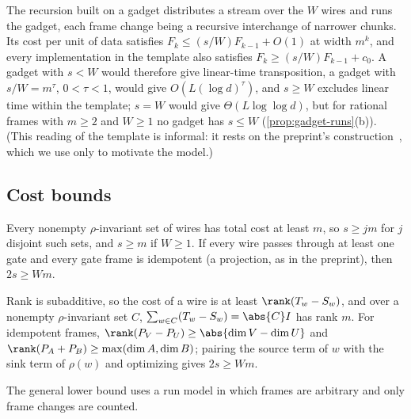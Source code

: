 The recursion built on a gadget distributes a stream over the $W$ wires and runs the gadget, each frame
change being a recursive interchange of narrower chunks. Its cost per unit of data satisfies
$F_k\le(s/W)F_{k-1}+O(1)$ at width $m^k$, and every implementation in the template also satisfies
$F_k\ge(s/W)F_{k-1}+c_0$. A gadget with $s<W$ would therefore give linear-time transposition, a gadget
with $s/W=m^\tau$, $0<\tau<1$, would give $O(L(\log d)^\tau)$, and $s\ge W$ excludes linear time within the
template; $s=W$ would give $\Theta(L\log\log d)$, but for rational frames with $m\ge2$ and $W\ge1$ no gadget has $s\le W$ (\cref{prop:gadget-runs}(b)). (This reading of the template is informal: it rests on the
preprint's construction~\cite{OpenAI2026mult}, which we use only to motivate the model.)

\subsection{Cost bounds}

\begin{theorem}\label{thm:cycle}
Every nonempty $\rho$-invariant set of wires has total cost at least $m$, so $s\ge jm$ for $j$ disjoint
such sets, and $s\ge m$ if $W\ge1$. If every wire passes through at least one gate and every gate frame is
idempotent (a projection, as in the preprint), then $2s\ge Wm$.
\end{theorem}

\begin{outline}
Rank is subadditive, so the cost of a wire is at least $\rank(T_w-S_w)$, and over a nonempty $\rho$-invariant set $C$,
$\sum_{w\in C}(T_w-S_w)=\abs{C}I$ has rank $m$. For idempotent frames, $\rank(P_V-P_U)\ge\abs{\dim V-\dim
U}$ and $\rank(P_A+P_B)\ge\max(\dim A,\dim B)$; pairing the source term of $w$ with the sink term of
$\rho(w)$ and optimizing gives $2s\ge Wm$.
\end{outline}

The general lower bound uses a run model in which frames are arbitrary and only frame changes are counted.

